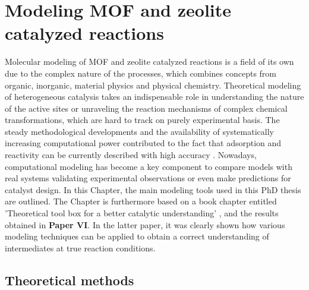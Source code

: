 \graphicspath{{figures/}}
\renewcommand\evenpagerightmark{{\scshape\small Modeling MOF catalyzed
reactions}} 
\renewcommand\oddpageleftmark{{\scshape\small Chapter 2}}


\hyphenation{}

\chapter[Modeling MOF and zeolite catalyzed reactions]%
{Modeling MOF and zeolite catalyzed reactions}
\label{ch2}
Molecular modeling of MOF and zeolite catalyzed reactions is a field of its
own due to the complex nature of the processes, which combines concepts from
organic, inorganic, material physics and physical chemistry. Theoretical modeling of heterogeneous catalysis takes an indispensable role in
understanding the nature of the active sites or unraveling the reaction
mechanisms of complex chemical transformations, which are hard to track on
purely experimental basis. The steady methodological developments and the
availability of systematically increasing computational power contributed to
the fact that adsorption and reactivity can be currently
described with high accuracy \cite{Piccini2016, Piccini2015}. Nowadays,
computational modeling has become a key component to compare models with real
systems validating experimental observations or even make predictions for
catalyst design.
In this Chapter, the main modeling tools used in this PhD thesis are outlined. 
The Chapter is furthermore based on a book chapter entitled 'Theoretical tool
box for a better catalytic understanding' \cite{Waroquier2017}, and the results
obtained in \textbf{Paper VI}. In the latter paper, it was clearly shown how various modeling techniques can be applied to obtain a correct understanding
of intermediates at true reaction conditions.


\section{Theoretical methods}
